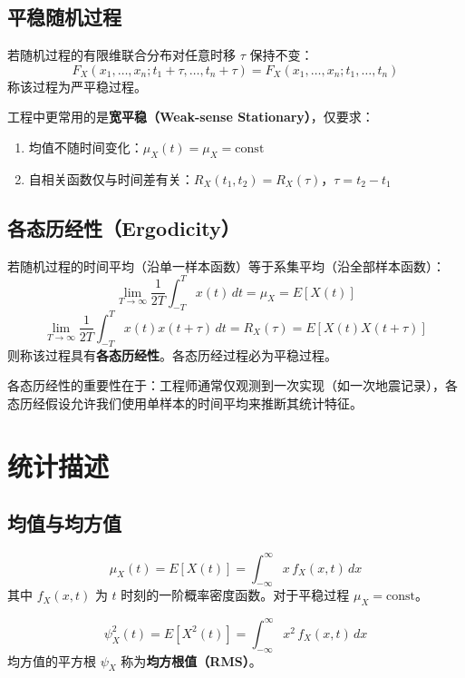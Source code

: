 \subsection{平稳随机过程}
\begin{definition}
若随机过程的有限维联合分布对任意时移 $\tau$ 保持不变：
\[
F_{X}(x_1,\dots,x_n; t_1+\tau, \dots, t_n+\tau) = F_{X}(x_1,\dots,x_n; t_1, \dots, t_n)
\]
称该过程为严平稳过程。
\end{definition}

工程中更常用的是\textbf{宽平稳（Weak-sense Stationary）}，仅要求：
\begin{enumerate}
    \item 均值不随时间变化：$\mu_X(t) = \mu_X = \text{const}$
    \item 自相关函数仅与时间差有关：$R_X(t_1, t_2) = R_X(\tau)$，$\tau = t_2 - t_1$
\end{enumerate}

\subsection{各态历经性（Ergodicity）}
\begin{definition}[各态历经性]
若随机过程的时间平均（沿单一样本函数）等于系集平均（沿全部样本函数）：
\[
\lim_{T\to\infty} \frac{1}{2T}\int_{-T}^{T} x(t)\,dt = \mu_X = E[X(t)]
\]
\[
\lim_{T\to\infty} \frac{1}{2T}\int_{-T}^{T} x(t)x(t+\tau)\,dt = R_X(\tau) = E[X(t)X(t+\tau)]
\]
则称该过程具有\textbf{各态历经性}。各态历经过程必为平稳过程。
\end{definition}

各态历经性的重要性在于：工程师通常仅观测到一次实现（如一次地震记录），各态历经假设允许我们使用单样本的时间平均来推断其统计特征。

\section{统计描述}
\subsection{均值与均方值}
\begin{definition}[均值函数]
\[
\mu_X(t) = E[X(t)] = \int_{-\infty}^{\infty} x \, f_X(x, t)\,dx
\]
其中 $f_X(x,t)$ 为 $t$ 时刻的一阶概率密度函数。对于平稳过程 $\mu_X = \text{const}$。
\end{definition}

\begin{definition}[均方值]
\[
\psi_X^{2}(t) = E[X^{2}(t)] = \int_{-\infty}^{\infty} x^{2} \, f_X(x, t)\,dx
\]
均方值的平方根 $\psi_X$ 称为\textbf{均方根值（RMS）}。
\end{definition}

